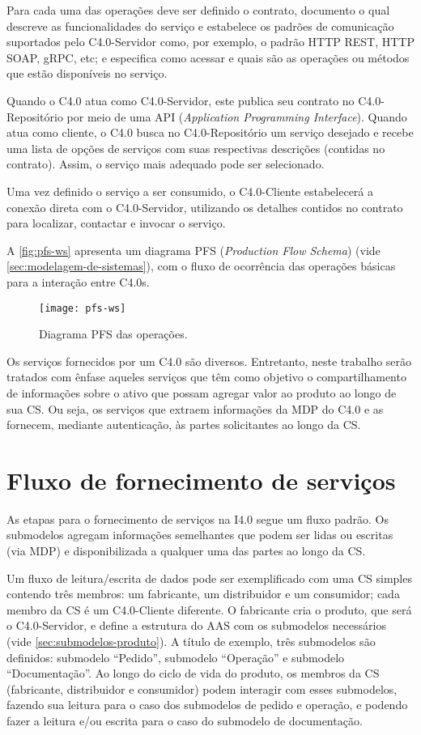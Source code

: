 Para cada uma das operações deve ser definido o contrato, documento o qual descreve as funcionalidades do serviço e estabelece os padrões de comunicação suportados pelo C4.0-Servidor como, por exemplo, o padrão HTTP REST, HTTP SOAP, gRPC, etc; e especifica como acessar e quais são as operações ou métodos que estão disponíveis no serviço.

Quando o C4.0 atua como C4.0-Servidor, este publica seu contrato no C4.0-Repositório por meio de uma API (\textit{Application Programming Interface}). Quando atua como cliente, o C4.0 busca no C4.0-Repositório um serviço desejado e recebe uma lista de opções de serviços com suas respectivas descrições (contidas no contrato). Assim, o serviço mais adequado pode ser selecionado.

Uma vez definido o serviço a ser consumido, o C4.0-Cliente estabelecerá a conexão direta com o C4.0-Servidor, utilizando os detalhes contidos no contrato para localizar, contactar e invocar o serviço.

A \autoref{fig:pfs-ws} apresenta um diagrama PFS (\textit{Production Flow Schema}) (vide \autoref{sec:modelagem-de-sistemas}), com o fluxo de ocorrência das operações básicas para a interação entre C4.0s.

\begin{figure}[htb]
	\centering
	\texttt{[image: pfs-ws]}
	\caption{Diagrama PFS das operações.}
	\label{fig:pfs-ws}
\end{figure}

Os serviços fornecidos por um C4.0 são diversos. Entretanto, neste trabalho serão tratados com ênfase aqueles serviços que têm como objetivo o compartilhamento de informações sobre o ativo que possam agregar valor ao produto ao longo de sua CS. Ou seja, os serviços que extraem informações da MDP do C4.0 e as fornecem, mediante autenticação, às partes solicitantes ao longo da CS.

\section{Fluxo de fornecimento de serviços}
\label{sec:fluxo-de-fornecimento-de-servicos}

As etapas para o fornecimento de serviços na I4.0 segue um fluxo padrão. Os submodelos agregam informações semelhantes que podem ser lidas ou escritas (via MDP) e disponibilizada a qualquer uma das partes ao longo da CS.

Um fluxo de leitura/escrita de dados pode ser exemplificado com uma CS simples contendo três membros: um fabricante, um distribuidor e um consumidor; cada membro da CS é um C4.0-Cliente diferente. O fabricante cria o produto, que será o C4.0-Servidor, e define a estrutura do AAS com os submodelos necessários (vide \autoref{sec:submodelos-produto}). A título de exemplo, três submodelos são definidos: submodelo ``Pedido'', submodelo ``Operação'' e submodelo ``Documentação''. Ao longo do ciclo de vida do produto, os membros da CS (fabricante, distribuidor e consumidor) podem interagir com esses submodelos, fazendo sua leitura para o caso dos submodelos de pedido e operação, e podendo fazer a leitura e/ou escrita para o caso do submodelo de documentação.

